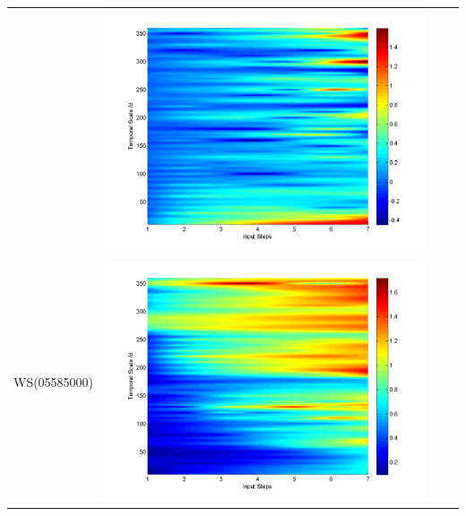 \documentclass[11pt]{article}
\begin{document}
\begin{table}[H]
{\begin{tabular}{cccc}
&\begin{minipage}{.3\textwidth}\includegraphics[width=\linewidth]{resultgraph/02143000diff_q.png}\end{minipage}
\\
WS(05585000)
&\begin{minipage}{.3\textwidth}\includegraphics[width=\linewidth]{resultgraph/05585000p.png}\end{minipage}

\end{tabular}}
\end{table}
\end{document}
